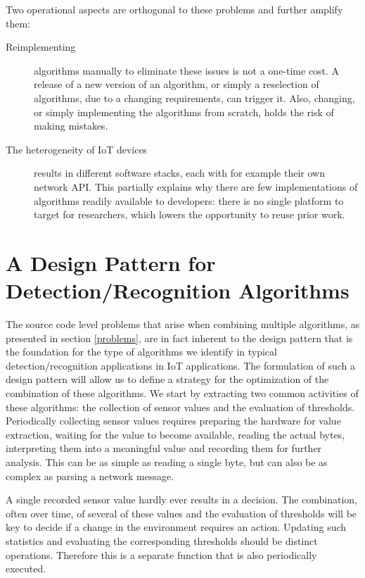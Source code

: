 \documentclass[3p,times,procedia]{elsarticle}
\begin{document}
Two operational aspects are orthogonal to these problems and further amplify
them:

\vspace{-2mm}

\begin{description}
  
  \item[Reimplementing] algorithms manually to eliminate these issues is
  not a one-time cost. A release of a new version of an algorithm, or simply a
  reselection of algorithms, due to a changing requirements, can trigger it.
  Also, changing, or simply implementing the algorithms from scratch, holds the
  risk of making mistakes.

\vspace{-2mm}

  \item[The heterogeneity of IoT devices] results in different software stacks,
  each with for example their own network API\@. This partially explains why
  there are few implementations of algorithms readily available to developers:
  there is no single platform to target for researchers, which lowers the
  opportunity to reuse prior work.

\end{description}

\section{A Design Pattern for Detection/Recognition Algorithms}
\label{pattern}

The source code level problems that arise when combining multiple algorithms,
as presented in section \ref{problems}, are in fact inherent to the design
pattern that is the foundation for the type of algorithms we identify in
typical detection/recognition applications in IoT applications. The formulation
of such a design pattern will allow us to define a strategy for the
optimization of the combination of these algorithms. We start by extracting two
common activities of these algorithms: the collection of sensor values and the
evaluation of thresholds. Periodically collecting sensor values requires
preparing the hardware for value extraction, waiting for the value to become
available, reading the actual bytes, interpreting them into a meaningful value
and recording them for further analysis. This can be as simple as reading a
single byte, but can also be as complex as parsing a network message.

A single recorded sensor value hardly ever results in a decision. The
combination, often over time, of several of these values and the evaluation of
thresholds will be key to decide if a change in the environment requires an
action. Updating such statistics and evaluating the corresponding thresholds
should be distinct operations. Therefore this is a separate function that is
also periodically executed.
\end{document}
